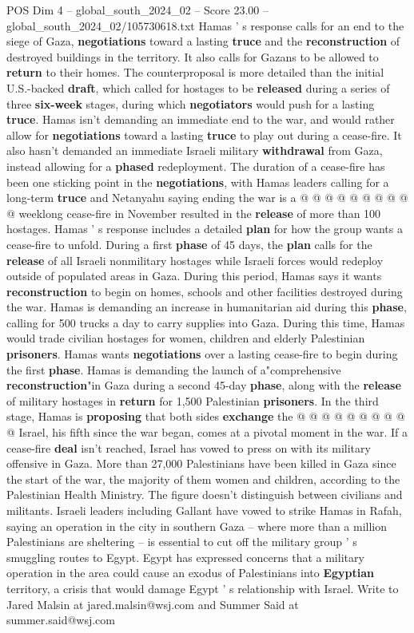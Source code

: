 \begin{textsample}{POS Dim 4 – global\_south\_2024\_02 – Score 23.00 – global\_south\_2024\_02/105730618.txt}
Hamas ' s response calls for an end to the siege of Gaza, \textbf{negotiations} toward a lasting \textbf{truce} and the \textbf{reconstruction} of destroyed buildings in the territory.
It also calls for Gazans to be allowed to \textbf{return} to their homes.
The counterproposal is more detailed than the initial U.S.-backed \textbf{draft}, which called for hostages to be \textbf{released} during a series of three \textbf{six-week} stages, during which \textbf{negotiators} would push for a lasting \textbf{truce}.
Hamas isn't demanding an immediate end to the war, and would rather allow for \textbf{negotiations} toward a lasting \textbf{truce} to play out during a cease-fire.
It also hasn't demanded an immediate Israeli military \textbf{withdrawal} from Gaza, instead allowing for a \textbf{phased} redeployment.
The duration of a cease-fire has been one sticking point in the \textbf{negotiations}, with Hamas leaders calling for a long-term \textbf{truce} and Netanyahu saying ending the war is a @ @ @ @ @ @ @ @ @ @ weeklong cease-fire in November resulted in the \textbf{release} of more than 100 hostages.
Hamas ' s response includes a detailed \textbf{plan} for how the group wants a cease-fire to unfold.
During a first \textbf{phase} of 45 days, the \textbf{plan} calls for the \textbf{release} of all Israeli nonmilitary hostages while Israeli forces would redeploy outside of populated areas in Gaza.
During this period, Hamas says it wants \textbf{reconstruction} to begin on homes, schools and other facilities destroyed during the war.
Hamas is demanding an increase in humanitarian aid during this \textbf{phase}, calling for 500 trucks a day to carry supplies into Gaza.
During this time, Hamas would trade civilian hostages for women, children and elderly Palestinian \textbf{prisoners}.
Hamas wants \textbf{negotiations} over a lasting cease-fire to begin during the first \textbf{phase}.
Hamas is demanding the launch of a"comprehensive \textbf{reconstruction}"in Gaza during a second 45-day \textbf{phase}, along with the \textbf{release} of military hostages in \textbf{return} for 1,500 Palestinian \textbf{prisoners}.
In the third stage, Hamas is \textbf{proposing} that both sides \textbf{exchange} the @ @ @ @ @ @ @ @ @ @ Israel, his fifth since the war began, comes at a pivotal moment in the war.
If a cease-fire \textbf{deal} isn't reached, Israel has vowed to press on with its military offensive in Gaza.
More than 27,000 Palestinians have been killed in Gaza since the start of the war, the majority of them women and children, according to the Palestinian Health Ministry.
The figure doesn't distinguish between civilians and militants.
Israeli leaders including Gallant have vowed to strike Hamas in Rafah, saying an operation in the city in southern Gaza -- where more than a million Palestinians are sheltering -- is essential to cut off the military group ' s smuggling routes to Egypt.
Egypt has expressed concerns that a military operation in the area could cause an exodus of Palestinians into \textbf{Egyptian} territory, a crisis that would damage Egypt ' s relationship with Israel.
Write to Jared Malsin at jared.malsin@wsj.com and Summer Said at summer.said@wsj.com


\end{textsample}
